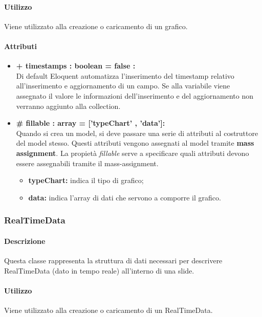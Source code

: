	\paragraph{Utilizzo}
	Viene utilizzato alla creazione o caricamento di un grafico.

	\paragraph{Attributi}
	\begin{itemize}
		\item \textbf{+ timestamps : boolean = false :}\\
		Di default Eloquent automatizza l'inserimento del timestamp relativo all'inserimento e aggiornamento di un campo. Se alla variabile viene assegnato il valore le informazioni dell'inserimento e del aggiornamento non verranno aggiunto alla collection.
		\item \textbf{\# fillable : array = [’typeChart’ , ’data’]:}\\
		Quando si crea un model, si deve passare una serie di attributi al costruttore del model stesso. Questi attributi vengono assegnati al model tramite \textbf{mass assignment}. La propietà \textit{fillable} serve a specificare quali attributi devono essere assegnabili tramite il mass-assignment.
		\begin{itemize}
			\item \textbf{typeChart:} indica il tipo di grafico;
			\item \textbf{data:} indica l'array di dati che servono a comporre il grafico.
		\end{itemize}
		
	\end{itemize}
\newpage


\subsubsection{RealTimeData}


	\paragraph{Descrizione}
	Questa classe rappresenta la struttura di dati necessari per descrivere RealTimeData (dato in tempo reale) all’interno di una slide.
	
	\paragraph{Utilizzo}
	Viene utilizzato alla creazione o caricamento di un RealTimeData.
	
